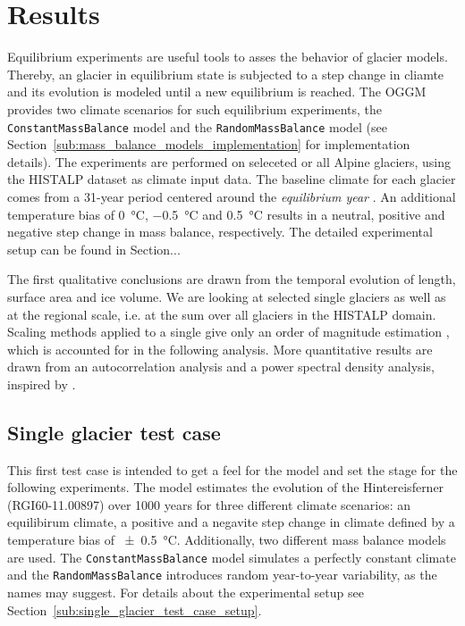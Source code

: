 \chapter{Results}\label{chap:results}
\thispagestyle{plain}

  Equilibrium experiments are useful tools to asses the behavior of glacier models. Thereby, an glacier in equilibrium state is subjected to a step change in cliamte and its evolution is modeled until a new equilibrium is reached. The OGGM provides two climate scenarios for such equilibrium experiments, the \lstinline`ConstantMassBalance` model and the \lstinline`RandomMassBalance` model (see Section~\ref{sub:mass_balance_models_implementation} for implementation details). The experiments are performed on seleceted or all Alpine glaciers, using the HISTALP dataset \citep{Auer2007} as climate input data. The baseline climate for each glacier comes from a 31-year period centered around the \textit{equilibrium year} \tstar. An additional temperature bias of \SI{0}{\celsius}, \SI{-0.5}{\celsius} and \SI{+0.5}{\celsius} results in a neutral, positive and negative step change in mass balance, respectively. The detailed experimental setup can be found in Section...

    The first qualitative conclusions are drawn from the temporal evolution of length, surface area and ice volume. We are looking at selected single glaciers as well as at the regional scale, i.e. at the sum over all glaciers in the HISTALP domain. Scaling methods applied to a single give only an order of magnitude estimation \citep[cf.][Section 8.5]{Bahr2015}, which is accounted for in the following analysis. More quantitative results are drawn from an autocorrelation analysis and a power spectral density analysis, inspired by \citet{Roe2014}. %


  \section{Single glacier test case} %
  \label{sec:single_glacier_test_case_results}

    This first test case is intended to get a feel for the \vas{} model and set the stage for the following experiments. The model estimates the evolution of the Hintereisferner (RGI60-11.00897) over 1000 years for three different climate scenarios: an equilibirum climate, a positive and a negavite step change in climate defined by a temperature bias of \SI{\pm0.5}{\celsius}. Additionally, two different mass balance models are used. The \lstinline`ConstantMassBalance` model simulates a perfectly constant climate and the \lstinline`RandomMassBalance` introduces random year-to-year variability, as the names may suggest. For details about the experimental setup see Section~\ref{sub:single_glacier_test_case_setup}.

